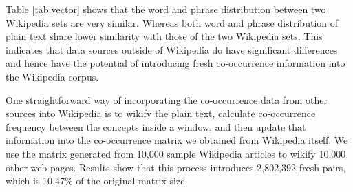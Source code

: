 Table \ref{tab:vector} shows that the word and phrase distribution
between two Wikipedia sets are very similar.
Whereas both word and phrase distribution of plain text share lower
similarity with those of the two Wikipedia sets. This indicates that
data sources outside of Wikipedia do have significant differences and hence
have the potential of introducing fresh co-occurrence information into
the Wikipedia corpus.

One straightforward way of incorporating the co-occurrence data from other sources
into Wikipedia is to wikify the plain text,
calculate co-occurrence frequency between the concepts inside a window, and then
update that information into the co-occurrence matrix we obtained from
Wikipedia itself.
We use the matrix generated from 10,000 sample Wikipedia articles to wikify
10,000 other web pages. Results show that this process introduces 2,802,392
fresh pairs, which is 10.47\% of the original matrix size.

%

